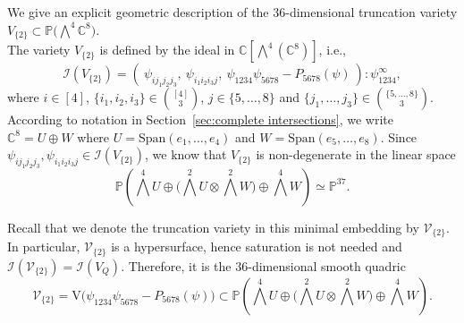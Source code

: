 \documentclass[11pt,reqno]{amsart}
\theoremstyle{definition}
\numberwithin{theorem}{section}
\numberwithin{equation}{section}
\begin{document}
We give an explicit geometric description of the $36$-dimensional truncation variety $V_{\{2\}} \subset \mathbb P\big(\bigwedge^4\mathbb C^8\big)$.\\
\indent The variety $V_{\{2\}}$ is defined by the ideal in $\mathbb C[\bigwedge^4 (\mathbb C^8)]$, i.e.,
\[ \mathcal{I}(V_{\{2\}}) = \left( \ \psi_{i j_1j_2j_3}, \ \psi_{i_1i_2i_3 j}, \ \psi_{1234}\psi_{5678} - P_{5678}(\psi) \ \right):\psi_{1234}^\infty, \]
where $i \in [4]$, $\{i_1,i_2,i_3\}\in \binom{[4]}{3}$, $j \in \{5,\ldots , 8\}$ and $\{j_1,\ldots , j_3\} \in \binom{\{5,\ldots , 8\}}{3}$. According to notation in Section~\ref{sec:complete intersections}, we write $\mathbb C^8 = U \oplus W$ where $U=\text{Span}(e_1,\ldots, e_4)$ and $W=\text{Span}(e_5,\ldots , e_8)$. Since $\psi_{ij_1j_2j_3}, \psi_{i_1i_2i_3j}\in \mathcal{I}(V_{\{2\}})$, we know that $V_{\{2\}}$ is non-degenerate in the linear space
\[ \mathbb P \left( \textstyle{ \bigwedge^4U \oplus \big( \bigwedge^2U \otimes \bigwedge^2 W \big) \oplus \bigwedge^4W} \right) \simeq \mathbb P^{37} .\]

\noindent Recall that we denote the truncation variety in this minimal embedding by $\mathscr{V}_{\{2\}}$. In particular, $\mathscr{V}_{\{2\}}$ is a hypersurface, hence saturation is not needed and $\mathcal{I}(\mathscr{V}_{\{2\}})=\mathcal{I}(V_Q)$. Therefore, it is the $36$-dimensional smooth quadric
\[ \mathscr{V}_{\{2\}} = \text{V}\big(\psi_{1234}\psi_{5678} - P_{5678}(\psi)\big) \subset \mathbb P \left( \textstyle{ \bigwedge^4U \oplus \big( \bigwedge^2U \otimes \bigwedge^2 W \big) \oplus \bigwedge^4W} \right) .\]
\end{document}
